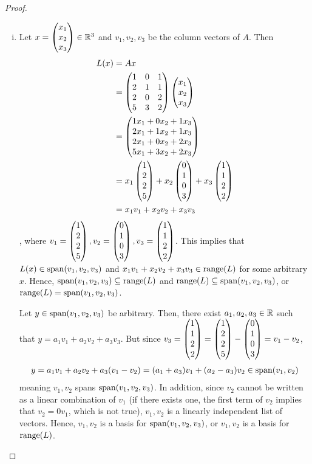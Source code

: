 \begin{proof}
    \renewcommand{\qedsymbol}{$\blacksquare$}
    \begin{enumerate}[(i)]
    \item 
        Let $x=\begin{pmatrix} x_1\\ x_2\\ x_3\end{pmatrix}\in\mathbb R^3$ and $v_1,v_2,v_3$ be the column vectors of $A$. Then 
        \[
            \begin{aligned}
                L(x) &= Ax\\
                &= \begin{pmatrix}
                    1 & 0 & 1 \\
                    2 & 1 & 1 \\
                    2 & 0 & 2 \\
                    5 & 3 & 2 
                   \end{pmatrix}\begin{pmatrix} x_1\\ x_2\\ x_3\end{pmatrix}\\
                &= \begin{pmatrix} 1x_1+0x_2+1x_3\\ 2x_1+1x_2+1x_3\\2x_1+0x_2+2x_3 \\ 5x_1+3x_2+2x_3\end{pmatrix}\\
                &= x_1 \begin{pmatrix} 1\\ 2\\2 \\ 5\end{pmatrix}+x_2 \begin{pmatrix} 0\\ 1\\0 \\ 3\end{pmatrix}+ x_3 \begin{pmatrix} 1\\ 1\\2 \\ 2\end{pmatrix}\\
                &= x_1v_1+x_2v_2+x_3v_3
            \end{aligned}
        \]
        , where $v_1=\begin{pmatrix} 1\\ 2\\2 \\ 5\end{pmatrix},v_2=\begin{pmatrix} 0\\ 1\\0 \\ 3\end{pmatrix},v_3=\begin{pmatrix} 1\\ 1\\2 \\ 2\end{pmatrix}$.
        This implies that $L(x)\in\textnormal{span}(v_1,v_2,v_3)$ and $x_1v_1+x_2v_2+x_3v_3\in\textnormal{range}(L)$ for some arbitrary $x$. Hence, $\textnormal{span}(v_1,v_2,v_3)\subseteq\textnormal{range}(L)$ and $\textnormal{range}(L)\subseteq\textnormal{span}(v_1,v_2,v_3)$, or $\textnormal{range}(L)=\textnormal{span}(v_1,v_2,v_3)$.
        
        Let $y\in\textnormal{span}(v_1,v_2,v_3)$ be arbitrary.
        Then, there exist $a_1,a_2,a_3\in\mathbb R$ such that $y=a_1v_1+a_2v_2+a_3v_3$.
        But since $v_3=\begin{pmatrix} 1\\ 1\\2 \\ 2\end{pmatrix}=\begin{pmatrix} 1\\ 2\\2 \\ 5\end{pmatrix}-\begin{pmatrix} 0\\ 1\\0 \\ 3\end{pmatrix}=v_1-v_2$,
        \[
            \begin{aligned}
                y=a_1v_1+a_2v_2+a_3(v_1-v_2)=(a_1+a_3)v_1+(a_2-a_3)v_2\in\textnormal{span}(v_1,v_2)
            \end{aligned}
        \]
        meaning $v_1,v_2$ spans $\textnormal{span}(v_1,v_2,v_3)$.
        In addition, since $v_2$ cannot be written as a linear combination of $v_1$ (if there exists one, the first term of $v_2$ implies that $v_2=0v_1$, which is not true), $v_1,v_2$ is a linearly independent list of vectors.
        Hence, $v_1,v_2$ is a basis for $\textnormal{span}(v_1,v_2,v_3)$, or $v_1,v_2$ is a basis for $\textnormal{range}(L)$.


\end{enumerate}
\end{proof}
